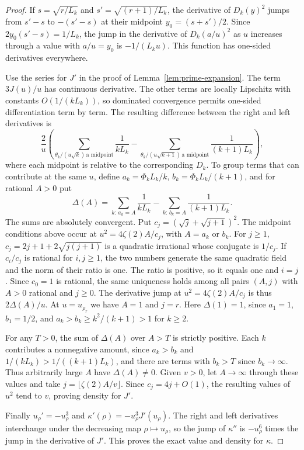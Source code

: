 \documentclass[11pt]{amsart}
\theoremstyle{remark}
\begin{document}
\begin{proof}
If \(s=\sqrt{r/L_k}\) and \(s'=\sqrt{(r+1)/L_k}\), the derivative of
\(D_k(y)^2\) jumps from \(s'-s\) to \(-(s'-s)\) at their midpoint
\(y_0=(s+s')/2\). Since \(2y_0(s'-s)=1/L_k\), the jump in the derivative
of \(D_k(a/u)^2\) as \(u\) increases through a value with \(a/u=y_0\)
is \(-1/(L_ku)\). This function has one-sided derivatives everywhere.

Use the series for \(J'\) in the proof of
Lemma~\ref{lem:prime-expansion}. The term \(3J(u)/u\) has continuous
derivative. The other terms are locally Lipschitz with constants
\(O(1/(kL_k))\), so dominated convergence permits one-sided
differentiation term by term. The resulting difference between the
right and left derivatives is
\[
 \frac{2}{u}
 \left(\sum_{\theta_k/(u\sqrt k)\,\text{a midpoint}}\frac1{kL_k}
   -\sum_{\theta_k/(u\sqrt{k+1})\,\text{a midpoint}}
            \frac1{(k+1)L_k}\right),
\]
where each midpoint is relative to the corresponding \(D_k\).
To group terms that can contribute at the same \(u\), define
\(a_k=\Phi_k L_k/k\),
\(b_k=\Phi_k L_k/(k+1)\), and for rational \(A>0\) put
\[
 \Delta(A)=\sum_{k:\,a_k=A}\frac{1}{kL_k}
          -\sum_{k:\,b_k=A}\frac{1}{(k+1)L_k}.
\]
The sums are absolutely convergent. Put \(c_j=(\sqrt{j}+\sqrt{j+1})^2\). The midpoint conditions above
occur at \(u^2=4\zeta(2)A/c_j\), with \(A=a_k\) or \(b_k\). For
\(j\ge1\), \(c_j=2j+1+2\sqrt{j(j+1)}\) is a quadratic irrational
whose conjugate is \(1/c_j\). If \(c_i/c_j\) is rational for
\(i,j\ge1\), the two numbers generate the same quadratic field
and the norm of their ratio is one. The ratio is positive, so it
equals one and \(i=j\). Since \(c_0=1\) is rational, the same
uniqueness holds among all pairs \((A,j)\) with \(A>0\) rational
and \(j\ge0\). The derivative jump at \(u^2=4\zeta(2)A/c_j\) is thus
\(2\Delta(A)/u\). At \(u=u_{\rho_r}\) we have \(A=1\) and \(j=r\).
Here \(\Delta(1)=1\), since \(a_1=1\), \(b_1=1/2\), and
\(a_k>b_k\ge k^2/(k+1)>1\) for \(k\ge2\).

For any \(T>0\), the sum of \(\Delta(A)\) over \(A>T\) is strictly
positive. Each \(k\) contributes a nonnegative amount, since
\(a_k>b_k\) and \(1/(kL_k)>1/((k+1)L_k)\), and there are terms with
\(b_k>T\) since \(b_k\to\infty\). Thus arbitrarily large \(A\) have
\(\Delta(A)\ne0\). Given \(v>0\), let \(A\to\infty\) through these
values and take \(j=\lfloor\zeta(2)A/v\rfloor\).
Since \(c_j=4j+O(1)\), the resulting values of \(u^2\) tend to \(v\),
proving density for \(J'\).

Finally \(u_\rho'=-u_\rho^3\) and \(\kappa'(\rho)=-u_\rho^3 J'(u_\rho)\).
The right and left derivatives interchange under the decreasing
map \(\rho\mapsto u_\rho\), so the jump of \(\kappa''\) is
\(-u_\rho^6\) times the jump in the derivative of \(J'\).
This proves the exact value and density for \(\kappa\).
\end{proof}
\end{document}
